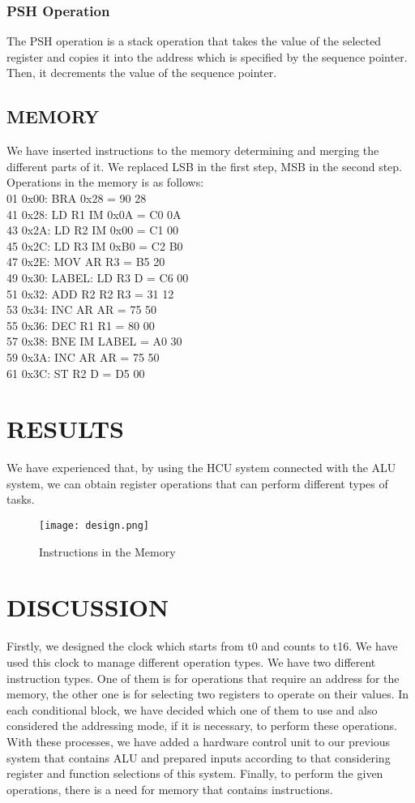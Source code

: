\documentclass[pdftex,12pt,a4paper]{article}
\begin{document}
\subsubsection{\textbf{PSH} Operation}
The PSH operation is a stack operation that takes the value of the selected register and copies it into the address which is specified by the sequence pointer. Then, it decrements the value of the sequence pointer.

\subsection{MEMORY}
We have inserted instructions to the memory determining and merging the different parts of it. We replaced LSB in the first step, MSB in the second step. Operations in the memory is as follows:
\\
01 0x00: BRA 0x28 = 90 28\\
41 0x28: LD R1 IM 0x0A = C0 0A\\
43 0x2A: LD R2 IM 0x00 = C1 00\\
45 0x2C: LD R3 IM 0xB0 = C2 B0\\
47 0x2E: MOV AR R3 = B5 20\\
49 0x30: LABEL: LD R3 D = C6 00\\
51 0x32: ADD R2 R2 R3 = 31 12\\
53 0x34: INC AR AR = 75 50\\
55 0x36: DEC R1 R1 = 80 00\\
57 0x38: BNE IM LABEL = A0 30\\
59 0x3A: INC AR AR = 75 50\\
61 0x3C: ST R2 D = D5 00\\

\section{RESULTS}
We have experienced that, by using the HCU system connected with the ALU system, we can obtain register operations that can perform different types of tasks. 
\begin{figure}[H]
	\centering
	\texttt{[image: design.png]}	
	\caption{Instructions in the Memory}
	\label{fig}
\end{figure}

\section{DISCUSSION}
Firstly, we designed the clock which starts from t0 and counts to t16. We have used this clock to manage different operation types. We have two different instruction types. One of them is for operations that require an address for the memory, the other one is for selecting two registers to operate on their values. In each conditional block, we have decided which one of them to use and also considered the addressing mode, if it is necessary, to perform these operations. With these processes, we have added a hardware control unit to our previous system that contains ALU and prepared inputs according to that considering register and function selections of this system. Finally, to perform the given operations, there is a need for memory that contains instructions. 
\end{document}
